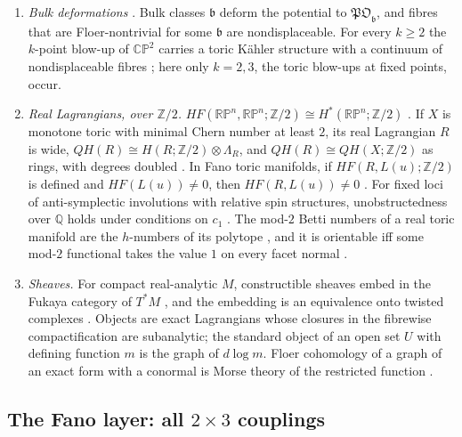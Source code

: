 \documentclass[11pt]{article}
\theoremstyle{definition}
\theoremstyle{remark}
\newcommand{\Z}{\mathbb{Z}}
\begin{document}
\begin{enumerate}[label=(T\arabic*),leftmargin=*]
  \[
  g_l(\check q)=\sum_d\frac{(-1)^{D_l\cdot d}\,(-D_l\cdot d-1)!}{\prod_{p\ne l}(D_p\cdot d)!}\,\check q^d,
  \]
  summed over effective classes $d$ with $-K_X\cdot d=0$, $D_l\cdot d<0$ and $D_p\cdot d\ge0$ for $p\ne l$.
\item \emph{Bulk deformations} \cite{FOOO2011}. Bulk classes $\mathfrak b$ deform the potential to $\mathfrak{PO}_{\mathfrak b}$,
  and fibres that are Floer-nontrivial for some $\mathfrak b$ are nondisplaceable. For every $k\ge2$ the $k$-point blow-up of
  $\mathbb{CP}^2$ carries a toric Kähler structure with a continuum of nondisplaceable fibres \cite[Thm.~1.1]{FOOO2011}; here only $k=2,3$, the toric
  blow-ups at fixed points, occur.
\item \emph{Real Lagrangians, over $\Z/2$.} $HF(\mathbb{RP}^n,\mathbb{RP}^n;\Z/2)\cong H^*(\mathbb{RP}^n;\Z/2)$ \cite{Oh1993}. If $X$
  is monotone toric with minimal Chern number at least $2$, its real Lagrangian $R$ is wide, $QH(R)\cong H(R;\Z/2)\otimes\Lambda_R$, and
  $QH(R)\cong QH(X;\Z/2)$ as rings, with degrees doubled \cite[Thm.~A]{Haug2013}. In Fano toric manifolds, if $HF(R,L(u);\Z/2)$ is defined and $HF(L(u))\ne0$,
  then $HF(R,L(u))\ne0$ \cite{AlstonAmorim2012}. For fixed loci of anti-symplectic involutions with relative spin structures,
  unobstructedness over $\mathbb Q$ holds under conditions on $c_1$ \cite[Cors.~1.6, 1.8]{FOOO2017}. The mod-$2$ Betti numbers of a real
  toric manifold are the $h$-numbers of its polytope \cite{DavisJanuszkiewicz1991}, and it is orientable iff some mod-$2$ functional
  takes the value $1$ on every facet normal \cite[Thm.~1.7]{NakayamaNishimura2005}.
\item \emph{Sheaves.} For compact real-analytic $M$, constructible sheaves embed in the Fukaya category of $T^*M$ \cite[Thm.~1.0.1]{NadlerZaslow2009},
  and the embedding is an equivalence onto twisted complexes \cite{Nadler2009}. Objects are exact Lagrangians whose closures in the
  fibrewise compactification are subanalytic; the standard object of an open set $U$ with defining function $m$ is the graph of
  $d\log m$. Floer cohomology of a graph of an exact form with a conormal is Morse theory of the restricted function
  \cite{Floer1989,Pozniak1999}.
\end{enumerate}

\subsection{The Fano layer: all $2\times3$ couplings}\label{sec:fano23}
\end{document}
